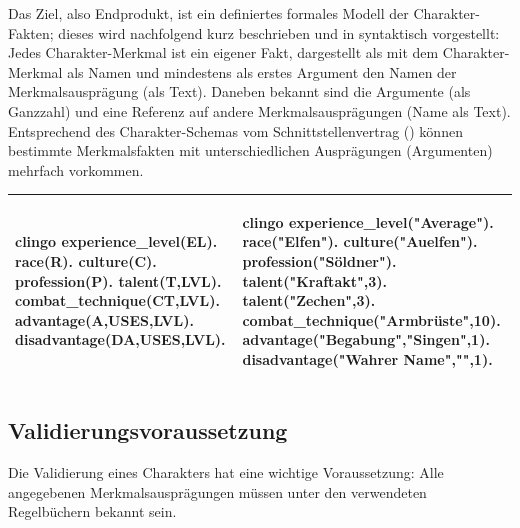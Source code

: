 Das Ziel, also Endprodukt, ist ein definiertes formales Modell der Charakter-Fakten; dieses wird nachfolgend kurz beschrieben und in  syntaktisch vorgestellt:
Jedes Charakter-Merkmal ist ein eigener Fakt, dargestellt als  mit dem Charakter-Merkmal als Namen und mindestens als erstes Argument den Namen der Merkmalsausprägung (als Text).
Daneben bekannt sind die Argumente  (als Ganzzahl) und eine Referenz auf andere Merkmalsausprägungen (Name als Text).
Entsprechend des Charakter-Schemas vom Schnittstellenvertrag () können bestimmte Merkmalsfakten mit unterschiedlichen Ausprägungen (Argumenten) mehrfach vorkommen.

\begin{listing}[htbp]
    \begin{tabular}{@{}p{}p{}@{}}
        \midrule
        \begin{mintedTabular}[frame=none]{clingo}
experience_level(EL).
race(R).
culture(C).
profession(P).
talent(T,LVL). %
combat_technique(CT,LVL).
advantage(A,USES,LVL). %
disadvantage(DA,USES,LVL).
        \end{mintedTabular}
        &
        \begin{mintedTabular}[frame=none]{clingo}
experience_level("Average").
race("Elfen").
culture("Auelfen").
profession("Söldner").
talent("Kraftakt",3). talent("Zechen",3).
combat_technique("Armbrüste",10).
advantage("Begabung","Singen",1).
disadvantage("Wahrer Name","",1).
        \end{mintedTabular}
        \\
        \midrule
    \end{tabular}
\end{listing}


\subsection{Validierungsvoraussetzung}\label{subsec:validierungsvoraussetzung}

Die Validierung eines Charakters hat eine wichtige Voraussetzung:
Alle angegebenen Merkmalsausprägungen müssen unter den verwendeten Regelbüchern bekannt sein.


